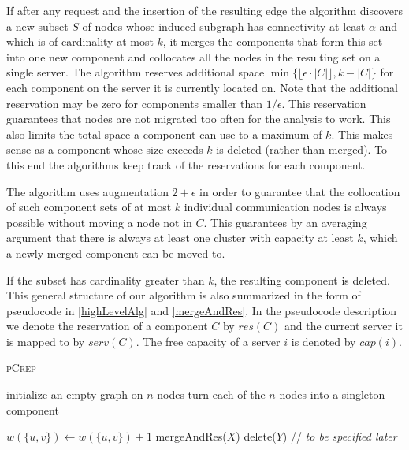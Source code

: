 \documentclass[a4paper,UKenglish,cleveref, autoref, thm-restate,authorcolumns]{lipics-v2019}
\newcommand{\adjDel}{\textsc{pCrep}}
\begin{document}
If after any request and the insertion of the resulting edge the algorithm discovers a new subset $S$ of nodes whose induced subgraph has connectivity at least $\alpha$ and which is of cardinality at most $k$, it merges the components that form this set into one new component and collocates all the nodes in the resulting set on a single server. The algorithm reserves additional space $\min\{\lfloor\epsilon\cdot|C|\rfloor,k-|C|\}$ for each component on the server it is currently located on. Note that the additional reservation may be zero for components smaller than $1/\epsilon$. This reservation guarantees that nodes are not migrated too often for the analysis to work. This also limits the total space a component can use to a maximum of $k$. This makes sense as a component whose size exceeds $k$ is deleted (rather than merged).
To this end the algorithms keep track of the reservations for each component.

The algorithm uses augmentation $2+\epsilon$ in order to guarantee that the collocation of such component sets of at most $k$ individual communication nodes is always possible without moving a node not in $C$. This guarantees by an averaging argument that there is always at least one cluster with capacity at least $k$, which a newly merged component can be moved to.

If the subset has cardinality greater than $k$, the resulting component is deleted.  
This general structure of our algorithm is also summarized in the form of pseudocode 
in \cref{highLevelAlg} and \cref{mergeAndRes}. 
In the pseudocode description we denote the reservation of a component $C$ by $res(C)$ and the current server it is mapped to by $serv(C)$. The free capacity of a server $i$ is denoted by $cap(i)$.

\begin{algorithm}[t]
	\caption{\adjDel{}}
	\label{highLevelAlg}
	\begin{algorithmic}
		\STATE initialize an empty graph on $n$ nodes
		\STATE turn each of the $n$ nodes into a singleton component
		
		\STATE $w(\{u,v\})\gets w(\{u,v\})+1$
		\ENDIF
		\STATE mergeAndRes($X$)
		\ENDIF
		\STATE delete($Y$) // \emph{to be specified later} 
		\ENDIF	
		
		\ENDFOR
		
	\end{algorithmic}
\end{algorithm}
\end{document}

